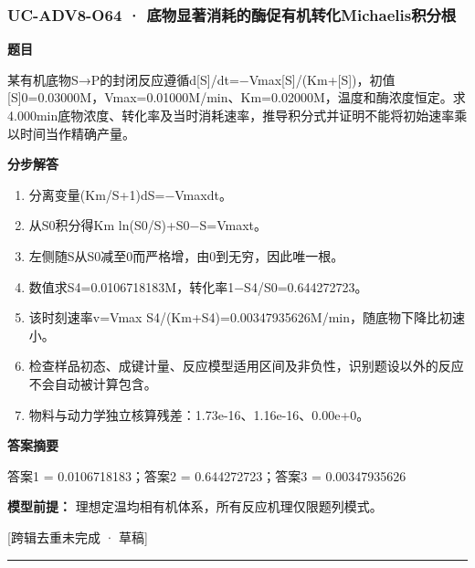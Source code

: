\documentclass[UTF8,11pt,a4paper]{ctexart}
\begin{document}
\subsubsection*{UC-ADV8-O64 · 底物显著消耗的酶促有机转化Michaelis积分根}
\noindent\textbf{题目}\par
某有机底物S→P的封闭反应遵循d[S]/dt=−Vmax[S]/(Km+[S])，初值[S]0=0.03000M，Vmax=0.01000M/min、Km=0.02000M，温度和酶浓度恒定。求4.000min底物浓度、转化率及当时消耗速率，推导积分式并证明不能将初始速率乘以时间当作精确产量。\par
\medskip\noindent\textbf{分步解答}
\begin{enumerate}
\item 分离变量(Km/S+1)dS=−Vmaxdt。
\item 从S0积分得Km ln(S0/S)+S0−S=Vmaxt。
\item 左侧随S从S0减至0而严格增，由0到无穷，因此唯一根。
\item 数值求S4=0.0106718183M，转化率1−S4/S0=0.644272723。
\item 该时刻速率v=Vmax S4/(Km+S4)=0.00347935626M/min，随底物下降比初速小。
\item 检查样品初态、成键计量、反应模型适用区间及非负性，识别题设以外的反应不会自动被计算包含。
\item 物料与动力学独立核算残差：1.73e-16、1.16e-16、0.00e+0。
\end{enumerate}
\noindent\textbf{答案摘要}\par
答案1 = 0.0106718183；答案2 = 0.644272723；答案3 = 0.00347935626\par
\noindent\textbf{模型前提：}
理想定温均相有机体系，所有反应机理仅限题列模式。\par
\noindent\textcolor{red!65!black}{[跨辑去重未完成 · 草稿]} \par
\medskip\hrule\medskip
{}
\end{document}
